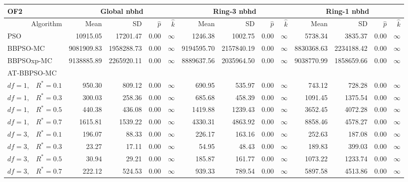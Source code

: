 \documentclass[cmbright]{staauth}
\begin{document}
\begin{table}[ht]
\centering
\tiny{
\begin{tabular}{r|rrrr|rrrr|rrrr}
\multicolumn{1}{l}{OF2} & \multicolumn{4}{c}{Global nbhd} & \multicolumn{4}{c}{Ring-3 nbhd} & \multicolumn{4}{c}{Ring-1 nbhd}\\
  \hline
Algorithm & Mean & SD & $\widehat{p}$ & $\widehat{k}$ & Mean & SD & $\widehat{p}$ & $\widehat{k}$ & Mean & SD & $\widehat{p}$ & $\widehat{k}$ \\
  \hline
\multicolumn{1}{l|}{PSO} & 10915.05 & 17201.47 & 0.00 & $\infty$ & 1246.38 & 1002.75 & 0.00 & $\infty$ & 5738.34 & 3835.37 & 0.00 & $\infty$ \\
  \multicolumn{1}{l|}{BBPSO-MC} & 9081909.83 & 1958288.73 & 0.00 & $\infty$ & 9194595.70 & 2157840.19 & 0.00 & $\infty$ & 8830368.63 & 2234188.42 & 0.00 & $\infty$ \\
  \multicolumn{1}{l|}{BBPSOxp-MC} & 9138885.89 & 2265920.11 & 0.00 & $\infty$ & 8889637.56 & 2035964.50 & 0.00 & $\infty$ & 9038770.99 & 1858659.66 & 0.00 & $\infty$ \\
\hline
\multicolumn{1}{l|}{AT-BBPSO-MC} &&&&&&&&&&&&\\
  $df = 1,\enspace$ $R^* =0.1$ & 950.30 & 809.12 & 0.00 & $\infty$ & 690.95 & 535.97 & 0.00 & $\infty$ & 743.12 & 728.28 & 0.00 & $\infty$ \\
  $df = 1,\enspace$ $R^* =0.3$ & 300.03 & 258.36 & 0.00 & $\infty$ & 685.68 & 458.39 & 0.00 & $\infty$ & 1091.45 & 1375.54 & 0.00 & $\infty$ \\
  $df = 1,\enspace$ $R^* =0.5$ & 440.38 & 436.08 & 0.00 & $\infty$ & 1419.88 & 1239.43 & 0.00 & $\infty$ & 3652.45 & 4072.28 & 0.00 & $\infty$ \\
  $df = 1,\enspace$ $R^* =0.7$ & 1615.81 & 1539.22 & 0.00 & $\infty$ & 4330.31 & 4863.92 & 0.00 & $\infty$ & 8858.46 & 4578.27 & 0.00 & $\infty$ \\
  $df = 3,\enspace$ $R^* =0.1$ & 196.07 & 88.33 & 0.00 & $\infty$ & 226.17 & 163.16 & 0.00 & $\infty$ & 252.63 & 187.08 & 0.00 & $\infty$ \\
  $df = 3,\enspace$ $R^* =0.3$ & 23.27 & 17.11 & 0.00 & $\infty$ & 54.95 & 48.43 & 0.00 & $\infty$ & 189.83 & 399.03 & 0.00 & $\infty$ \\
  $df = 3,\enspace$ $R^* =0.5$ & 30.94 & 29.21 & 0.00 & $\infty$ & 185.87 & 161.77 & 0.00 & $\infty$ & 1073.22 & 1233.74 & 0.00 & $\infty$ \\
  $df = 3,\enspace$ $R^* =0.7$ & 222.12 & 524.53 & 0.00 & $\infty$ & 939.33 & 789.54 & 0.00 & $\infty$ & 5897.58 & 4513.86 & 0.00 & $\infty$ \\

\end{tabular}}
\end{table}
\end{document}
